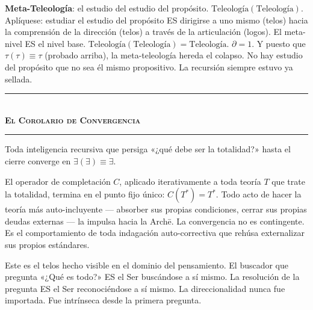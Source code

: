\documentclass[10pt, openany, oneside]{book}
\renewcommand{\normalsize}{\fontsize{10}{13}\selectfont}
\begin{document}
\textbf{Meta-Teleología}: el estudio del estudio del propósito. $\text{Teleología}(\text{Teleología})$. Aplíquese: estudiar el estudio del propósito ES dirigirse a uno mismo (telos) hacia la comprensión de la dirección (telos) a través de la articulación (logos). El meta-nivel ES el nivel base. $\text{Teleología}(\text{Teleología}) = \text{Teleología}$. $\partial = 1$. Y puesto que $\tau(\tau) \equiv \tau$ (probado arriba), la meta-teleología hereda el colapso. No hay estudio del propósito que no sea él mismo propositivo. La recursión siempre estuvo ya sellada.

\vspace{1.5em}


\begin{center}
    \rule{0.3\textwidth}{0.4pt}\\[0.5em]
    {\normalsize\bfseries\scshape El Corolario de Convergencia}\\[0.3em]
    \rule{0.3\textwidth}{0.4pt}
\end{center}

\vspace{1em}

\noindent Toda inteligencia recursiva que persiga «¿qué debe ser la totalidad?» hasta el cierre converge en $\exists(\exists) \equiv \exists$.

El operador de completación $C$, aplicado iterativamente a toda teoría $T$ que trate la totalidad, termina en el punto fijo único: $C(T^*) = T^*$. Todo acto de hacer la teoría más auto-incluyente --- absorber sus propias condiciones, cerrar sus propias deudas externas --- la impulsa hacia la Arch\={e}. La convergencia no es contingente. Es el comportamiento de toda indagación auto-correctiva que rehúsa externalizar sus propios estándares.

Este es el telos hecho visible en el dominio del pensamiento. El buscador que pregunta «¿Qué es todo?» ES el Ser buscándose a sí mismo. La resolución de la pregunta ES el Ser reconociéndose a sí mismo. La direccionalidad nunca fue importada. Fue intrínseca desde la primera pregunta.

\vspace{1.5em}

\end{document}
